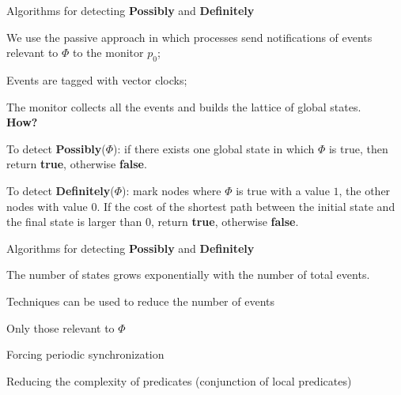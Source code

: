 \begin{frame}{Algorithms for detecting {\bf Possibly} and {\bf Definitely}}

\BI
\item We use the passive approach in which processes send notifications of events 
  relevant to $\Phi$ to the monitor $p_0$;
\item Events are tagged with vector clocks; 
\item The monitor collects all the events and builds the lattice of global
  states.\\
  {\bf How?}
\item To detect {\bf Possibly}($\Phi$): if there exists one 
  global state in which $\Phi$ is true, then return {\bf true}, otherwise
  {\bf false}.
\item To detect {\bf Definitely}($\Phi$): mark nodes where $\Phi$ is true
  with a value $1$, the other nodes with value $0$. If the cost of the 
  shortest path between the initial state and the final state is larger
  than $0$, return {\bf true}, otherwise
  {\bf false}.
\EI

\end{frame}

\begin{frame}{Algorithms for detecting {\bf Possibly} and {\bf Definitely}}

\BIL
\item The number of states grows exponentially with the number of total
  events. 
\item Techniques can be used to reduce the number of events
\BI
\item Only those relevant to $\Phi$
\item Forcing periodic synchronization
\item Reducing the complexity of predicates (conjunction of local predicates)
\EI
\EIL

\end{frame}

\nocite{ozalp93consistent}


\ReadingMaterial




